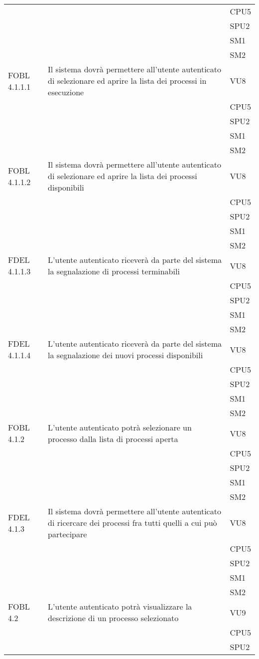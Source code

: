 \begin{longtable}{lXl}
&&CPU5\\
&&SPU2\\
&&SM1\\
&&SM2\\
\midrule
FOBL 4.1.1.1&Il sistema dovrà permettere all'utente autenticato di selezionare ed aprire la lista dei processi in esecuzione&VU8\\
&&CPU5\\
&&SPU2\\
&&SM1\\
&&SM2\\
\midrule
FOBL 4.1.1.2&Il sistema dovrà permettere all'utente autenticato di selezionare ed aprire la lista dei processi disponibili&VU8\\
&&CPU5\\
&&SPU2\\
&&SM1\\
&&SM2\\
\midrule
FDEL 4.1.1.3&L'utente autenticato riceverà da parte del sistema la segnalazione di processi terminabili&VU8\\
&&CPU5\\
&&SPU2\\
&&SM1\\
&&SM2\\
\midrule
FDEL 4.1.1.4&L'utente autenticato riceverà da parte del sistema la segnalazione dei nuovi processi disponibili&VU8\\
&&CPU5\\
&&SPU2\\
&&SM1\\
&&SM2\\
\midrule
FOBL 4.1.2&L'utente autenticato potrà selezionare un processo dalla lista di processi aperta&VU8\\
&&CPU5\\
&&SPU2\\
&&SM1\\
&&SM2\\
\midrule
FDEL 4.1.3&Il sistema dovrà permettere all'utente autenticato di ricercare dei processi fra tutti quelli a cui può partecipare&VU8\\
&&CPU5\\
&&SPU2\\
&&SM1\\
&&SM2\\
\midrule
FOBL 4.2&L'utente autenticato potrà visualizzare la descrizione di un processo selezionato&VU9\\
&&CPU5\\
&&SPU2\\

\end{longtable}
